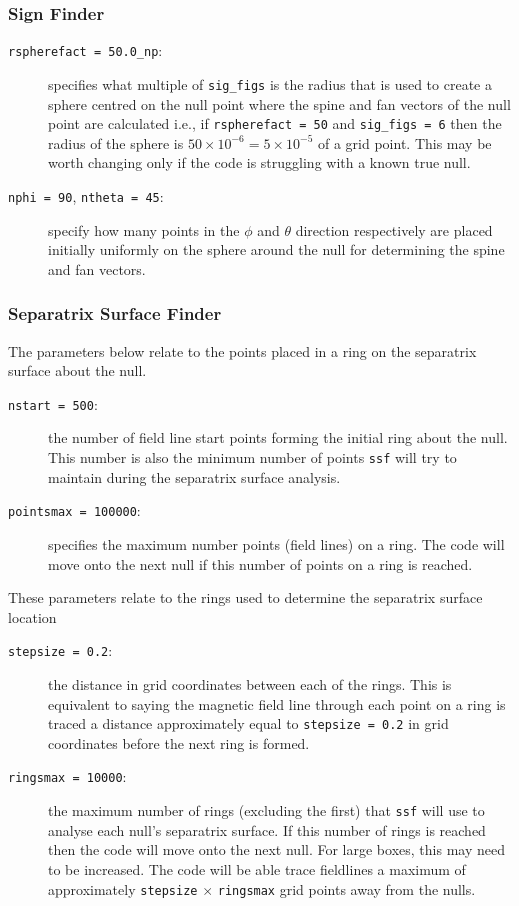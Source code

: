 \documentclass[12pt]{article}
\begin{document}
      \subsubsection{Sign Finder}
        \begin{description}
          \item [\texttt{rspherefact = 50.0\_np}:] specifies what multiple of \texttt{sig\_figs} is the radius that is used to create a sphere centred on the null point where the spine and fan vectors of the null point are calculated i.e., if \texttt{rspherefact = 50} and \texttt{sig\_figs = 6} then the radius of the sphere is  \( 50 \times 10^{-6} = 5\times 10^{-5} \) of a grid point. This may be worth changing only if the code is struggling with a known true null.
          \item [\texttt{nphi = 90}, \texttt{ntheta = 45}:] specify how many points in the \( \phi \) and \( \theta \) direction respectively are placed initially uniformly on the sphere around the null for determining the spine and fan vectors.
        \end{description}

      \subsubsection{Separatrix Surface Finder}
        The parameters below relate to the points placed in a ring on the separatrix surface about the null.
        \begin{description}
          \item [\texttt{nstart = 500}:] the number of field line start points forming the initial ring about the null. This number is also the minimum number of points \texttt{ssf} will try to maintain during the separatrix surface analysis.
          \item [\texttt{pointsmax = 100000}:] specifies the maximum number points (field lines) on a ring. The code will move onto the next null if this number of points on a ring is reached.
        \end{description}
        
        These parameters relate to the rings used to determine the separatrix surface location
        
        \begin{description}
          \item [\texttt{stepsize = 0.2}:] the distance in grid coordinates between each of the rings. This is equivalent to saying the magnetic field line through each point on a ring is traced a distance approximately equal to \texttt{stepsize = 0.2} in grid coordinates before the next ring is formed.
          \item [\texttt{ringsmax = 10000}:] the maximum number of rings (excluding the first) that \texttt{ssf} will use to analyse each null's separatrix surface. If this number of rings is reached then the code will move onto the next null. For large boxes, this may need to be increased. The code will be able trace fieldlines a maximum of approximately \texttt{stepsize} \( \times \) \texttt{ringsmax} grid points away from the nulls.
        \end{description}
        
\end{document}
